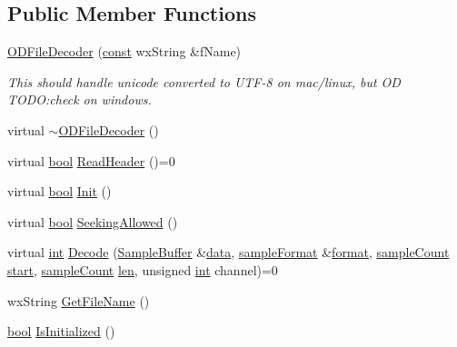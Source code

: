 \subsection*{Public Member Functions}
\begin{DoxyCompactItemize}
\item 
\hyperlink{class_o_d_file_decoder_ad491afa8ad81e9ed8c018338b1991068}{O\+D\+File\+Decoder} (\hyperlink{getopt1_8c_a2c212835823e3c54a8ab6d95c652660e}{const} wx\+String \&f\+Name)
\begin{DoxyCompactList}\small\item\em This should handle unicode converted to U\+T\+F-\/8 on mac/linux, but OD T\+O\+DO\+:check on windows. \end{DoxyCompactList}\item 
virtual \hyperlink{class_o_d_file_decoder_a106cba2280b68ea6f0743e8d4ab4e773}{$\sim$\+O\+D\+File\+Decoder} ()
\item 
virtual \hyperlink{mac_2config_2i386_2lib-src_2libsoxr_2soxr-config_8h_abb452686968e48b67397da5f97445f5b}{bool} \hyperlink{class_o_d_file_decoder_a0aa7f2105d4a4f80871987b2ef2a484f}{Read\+Header} ()=0
\item 
virtual \hyperlink{mac_2config_2i386_2lib-src_2libsoxr_2soxr-config_8h_abb452686968e48b67397da5f97445f5b}{bool} \hyperlink{class_o_d_file_decoder_acb8e4e1f02377b860252001d3ecd795b}{Init} ()
\item 
virtual \hyperlink{mac_2config_2i386_2lib-src_2libsoxr_2soxr-config_8h_abb452686968e48b67397da5f97445f5b}{bool} \hyperlink{class_o_d_file_decoder_a3df0706b5395a947804af71a41368aa1}{Seeking\+Allowed} ()
\item 
virtual \hyperlink{xmltok_8h_a5a0d4a5641ce434f1d23533f2b2e6653}{int} \hyperlink{class_o_d_file_decoder_a14fc5de37815bd1738e26ec427470a72}{Decode} (\hyperlink{class_sample_buffer}{Sample\+Buffer} \&\hyperlink{lib_2expat_8h_ac39e72a1de1cb50dbdc54b08d0432a24}{data}, \hyperlink{include_2audacity_2_types_8h_a9938d2e2f6adef23e745cd80ef379792}{sample\+Format} \&\hyperlink{_export_p_c_m_8cpp_a317afff57d87a89158c2b038d37b2b08}{format}, \hyperlink{include_2audacity_2_types_8h_afa427e1f521ea5ec12d054e8bd4d0f71}{sample\+Count} \hyperlink{seqread_8c_ac503262ae470564980711da4f78b1181}{start}, \hyperlink{include_2audacity_2_types_8h_afa427e1f521ea5ec12d054e8bd4d0f71}{sample\+Count} \hyperlink{lib_2expat_8h_af86d325fecfc8f47b61fbf5a5146f582}{len}, unsigned \hyperlink{xmltok_8h_a5a0d4a5641ce434f1d23533f2b2e6653}{int} channel)=0
\item 
wx\+String \hyperlink{class_o_d_file_decoder_a9dd7b78accace9bb9754df84eef6b3cf}{Get\+File\+Name} ()
\item 
\hyperlink{mac_2config_2i386_2lib-src_2libsoxr_2soxr-config_8h_abb452686968e48b67397da5f97445f5b}{bool} \hyperlink{class_o_d_file_decoder_a5a57197fd38c5d22e741cca5bb6a8fef}{Is\+Initialized} ()
\end{DoxyCompactItemize}
